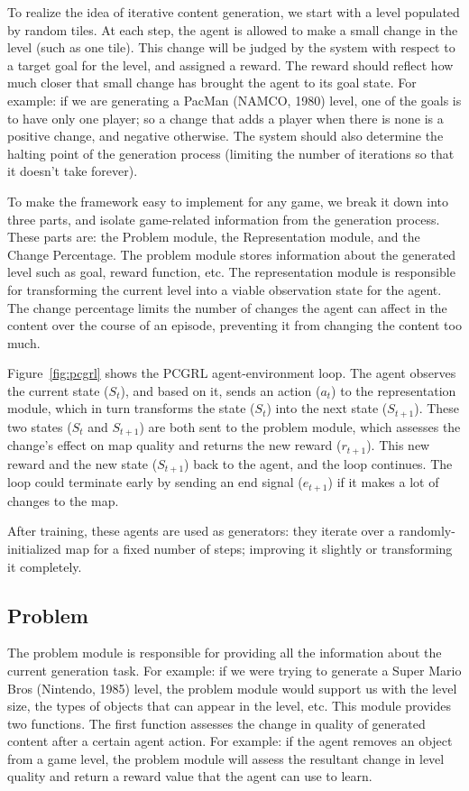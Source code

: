 \documentclass[letterpaper]{article} %
\begin{document}
To realize the idea of iterative content generation, we start with a level populated by random tiles. At each step, the agent is allowed to make a small change in the level (such as one tile). This change will be judged by the system with respect to a target goal for the level, and assigned a reward. The reward should reflect how much closer that small change has brought the agent to its goal state. For example: if we are generating a PacMan (NAMCO, 1980) level, one of the goals is to have only one player; so a change that adds a player when there is none is a positive change, and negative otherwise. The system should also determine the halting point of the generation process (limiting the number of iterations so that it doesn't take forever).

To make the framework easy to implement for any game, we break it down into three parts, and isolate game-related information from the generation process. These parts are: the Problem module, the Representation module, and the Change Percentage. The problem module stores information about the generated level such as goal, reward function, etc. The representation module is responsible for transforming the current level into a viable observation state for the agent. The change percentage limits the number of changes the agent can affect in the content over the course of an episode, preventing it from changing the content too much. 

Figure~\ref{fig:pcgrl} shows the PCGRL agent-environment loop. The agent observes the current state ($S_{t}$), and based on it, sends an action ($a_{t}$) to the representation module, which in turn transforms the state ($S_{t}$) into the next state ($S_{t+1}$). These two states ($S_{t}$ and $S_{t+1}$) are both sent to the problem module, which assesses the change's effect on map quality and returns the new reward ($r_{t+1}$). This new reward and the new state ($S_{t+1}$) back to the agent, and the loop continues. The loop could terminate early by sending an end signal ($e_{t+1}$) if it makes a lot of changes to the map.

After training, these agents are used as generators: they iterate over a randomly-initialized map for a fixed number of steps; improving it slightly or transforming it completely.

\subsection{Problem}
The problem module is responsible for providing all the information about the current generation task. For example: if we were trying to generate a Super Mario Bros (Nintendo, 1985) level, the problem module would support us with the level size, the types of objects that can appear in the level, etc. This module provides two functions. The first function assesses the change in quality of generated content after a certain agent action. For example: if the agent removes an object from a game level, the problem module will assess the resultant change in level quality and return a reward value that the agent can use to learn. 
\end{document}
